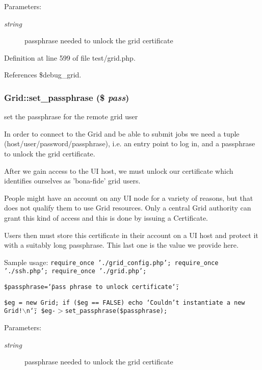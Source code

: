 \begin{Desc}
\item[Parameters:]
\begin{description}
\item[{\em string}]passphrase needed to unlock the grid certificate \end{description}
\end{Desc}


Definition at line 599 of file test/grid.php.

References \$debug\_\-grid.
\subsubsection{\setlength{\rightskip}{0pt plus 5cm}Grid::set\_\-passphrase (\$ {\em pass})}\label{classGrid_a5}


set the passphrase for the remote grid user 

In order to connect to the Grid and be able to submit jobs we need a tuple (host/user/password/passphrase), i.e. an entry point to log in, and a passphrase to unlock the grid certificate.

After we gain access to the UI host, we must unlock our certificate which identifies ourselves as 'bona-fide' grid users.

People might have an account on any UI node for a variety of reasons, but that does not qualify them to use Grid resources. Only a central Grid authority can grant this kind of access and this is done by issuing a Certificate.

Users then must store this certificate in their account on a UI host and protect it with a suitably long passphrase. This last one is the value we provide here.

Sample usage: {\tt  require\_\-once './grid\_\-config.php'; require\_\-once './ssh.php'; require\_\-once './grid.php';}

{\tt  \$passphrase=\char`\"{}pass phrase to unlock certificate\char`\"{};}

{\tt  \$eg = new Grid; if (\$eg == FALSE) echo \char`\"{}Couldn't instantiate a new Grid!$\backslash$n\char`\"{}; \$eg-$>$set\_\-passphrase(\$passphrase); }

\begin{Desc}
\item[Parameters:]
\begin{description}
\item[{\em string}]passphrase needed to unlock the grid certificate \end{description}
\end{Desc}


